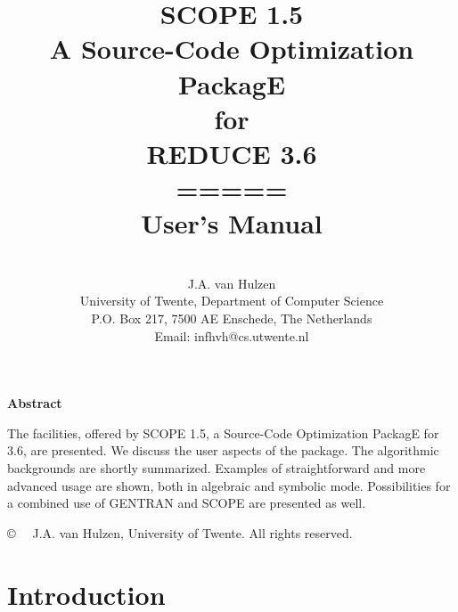 \pagestyle{empty}
\makeindex
\title{{\bf SCOPE 1.5\\ A Source-Code Optimization PackagE\\ for\\ REDUCE 3.6\\
\vspace{0.5cm}
=====\\
\vspace{0.5cm} User's Manual}}
\date{}
\author {\large
 \vspace{1cm} \\
J.A. van Hulzen \\ University of Twente, Department of Computer Science\\
P.O. Box 217, 7500 AE Enschede, The Netherlands \\
Email: infhvh@cs.utwente.nl}
\newcommand{\ad}{\mbox{$\rightarrow$}\hspace{-.30cm}{$/$}\hspace{.30cm}}



\maketitle
\vspace{3cm}
\begin{center}
{\bf Abstract}\\
\end{center}

The facilities, offered by SCOPE 1.5, a Source-Code Optimization PackagE
for {\REDUCE} 3.6, are presented. We discuss the user aspects of the package.
The algorithmic backgrounds are shortly summarized.
Examples of straightforward and more advanced usage are shown,
both in algebraic and symbolic mode.
Possibilities for a combined use of GENTRAN and SCOPE are presented as well.

\vspace{1.5cm}
\copyright {\em \ \ } J.A. van Hulzen, University of Twente. All rights reserved.

\newpage
\tableofcontents
\newpage
\pagestyle{headings}
\section{Introduction}\label{SCOPE:intro}


